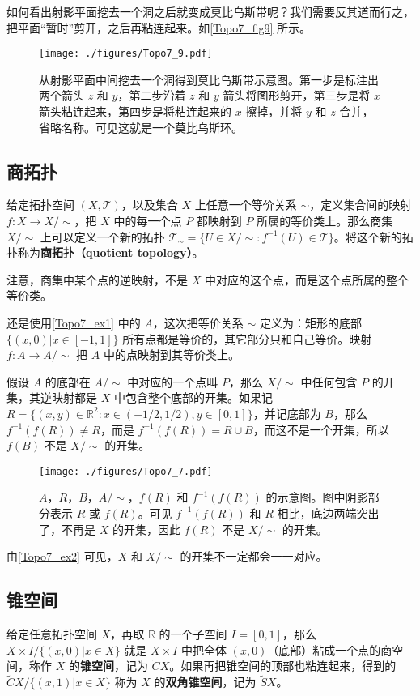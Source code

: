 如何看出射影平面挖去一个洞之后就变成莫比乌斯带呢？我们需要反其道而行之，把平面“暂时”剪开，之后再粘连起来。如\autoref{Topo7_fig9} 所示。

\begin{figure}[ht]
\centering
\texttt{[image: ./figures/Topo7\_9.pdf]}
\caption{从射影平面中间挖去一个洞得到莫比乌斯带示意图。第一步是标注出两个箭头 $z$ 和 $y$，第二步沿着 $z$ 和 $y$ 箭头将图形剪开，第三步是将 $x$ 箭头粘连起来，第四步是将粘连起来的 $x$ 擦掉，并将 $y$ 和 $z$ 合并，省略名称。可见这就是一个莫比乌斯环。} \label{Topo7_fig9}
\end{figure}

\subsection{商拓扑}

给定拓扑空间 $(X, \mathcal{T})$，以及集合 $X$ 上任意一个等价关系 $\sim$，定义集合间的映射 $f:X\rightarrow X/\sim$，把 $X$ 中的每一个点 $P$ 都映射到 $P$ 所属的等价类上。那么商集 $X/\sim$ 上可以定义一个新的拓扑 $\mathcal{T}_\sim=\{U\in X/\sim: f^{-1}(U)\in\mathcal{T}\}$。将这个新的拓扑称为\textbf{商拓扑（quotient topology）}。

注意，商集中某个点的逆映射，不是 $X$ 中对应的这个点，而是这个点所属的整个等价类。

\begin{example}{}\label{Topo7_ex2}

还是使用\autoref{Topo7_ex1} 中的 $A$，这次把等价关系 $\sim$ 定义为：矩形的底部 $\{(x,0)|x\in[-1,1]\}$ 所有点都是等价的，其它部分只和自己等价。映射 $f:A\rightarrow A/\sim$ 把 $A$ 中的点映射到其等价类上。

假设 $A$ 的底部在 $A/\sim$ 中对应的一个点叫 $P$，那么 $X/\sim$ 中任何包含 $P$ 的开集，其逆映射都是 $X$ 中包含整个底部的开集。如果记 $R=\{(x,y)\in\mathbb{R}^2:x\in(-1/2,1/2),y\in[0,1]\}$，并记底部为 $B$，那么 $f^{-1}(f(R))\not=R$，而是 $f^{-1}(f(R))=R\cup B$，而这不是一个开集，所以 $f(B)$ 不是 $X/\sim$ 的开集。


\begin{figure}[ht]
\centering
\texttt{[image: ./figures/Topo7\_7.pdf]}
\caption{$A$，$R$，$B$，$A/\sim$，$f(R)$ 和 $f^{-1}(f(R))$ 的示意图。图中阴影部分表示 $R$ 或 $f(R)$。可见 $f^{-1}(f(R))$ 和 $R$ 相比，底边两端突出了，不再是 $X$ 的开集，因此 $f(R)$ 不是 $X/\sim$ 的开集。} \label{Topo7_fig7}
\end{figure}

\end{example}

由\autoref{Topo7_ex2} 可见，$X$ 和 $X/\sim$ 的开集不一定都会一一对应。

\subsection{锥空间}

给定任意拓扑空间 $X$，再取 $\mathbb{R}$ 的一个子空间 $I=[0,1]$，那么 $X\times I/\{(x,0)|x\in X\}$ 就是 $X\times I$ 中把全体 $(x, 0)$（底部）粘成一个点的商空间，称作 $X$ 的\textbf{锥空间}，记为 $\widetilde{C}X$。如果再把锥空间的顶部也粘连起来，得到的 $\widetilde{C}X/\{(x,1)|x\in X\}$ 称为 $X$ 的\textbf{双角锥空间}，记为 $\widetilde{S}X$。

